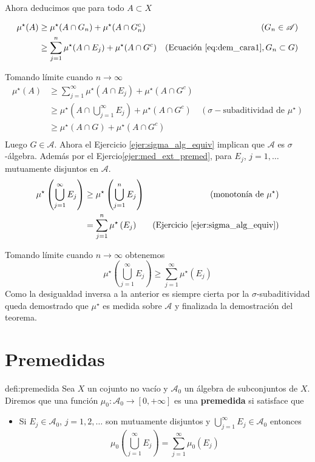 \begin{demo}
Ahora deducimos que para todo $A\subset X$


\begin{align*}
\mu^\star( A)&\geq  \mu^\star(A\cap G_n)+ \mu^\star(A\cap G_n^c) & (G_n\in\mathscr{A})\\
& \geq \sum_{j=1}^n\mu^\star(A\cap E_j)+\mu^\star(A\cap G^c) & (\text{Ecuación \eqref{eq:dem_cara1}}, G_n\subset G)\\ 
\end{align*}

Tomando límite cuando $n\to\infty$
\begin{align*}
\mu^\star( A)&\geq  \sum_{j=1}^{\infty}\mu^\star(A\cap E_j)+\mu^\star(A\cap G^c) &  \\ 
             &\geq  \mu^\star\left(A\cap \bigcup_{j=1}^{\infty} E_j\right)+\mu^\star(A\cap G^c) & (\sigma-\text{subaditividad de } \mu^\star)  \\ 
             &\geq  \mu^\star\left(A\cap G \right)+\mu^\star(A\cap G^c) &   \\ 
\end{align*}
Luego $G\in\mathscr{A}$. Ahora el Ejercicio \ref{ejer:sigma_alg_equiv} implican que $\mathscr{A}$ es $\sigma$-álgebra. Además por el Ejercio\ref {ejer:med_ext_premed}, para $E_j$, $j=1,\ldots$ mutuamente disjuntos en $\mathscr{A}$.
\begin{align*}
 \mu^\star\left(\bigcup_{j=1}^{\infty} E_j\right) &\geq \mu^\star\left(\bigcup_{j=1}^{n} E_j\right) & (\text{monotonía de } \mu^\star)\\ 
 &= \sum_{j=1}^{n}  \mu^\star\left(E_j\right) & (\text{Ejercicio \ref{ejer:sigma_alg_equiv}}) \\ 
\end{align*}

Tomando límite cuando $n\to\infty$ obtenemos 
\[\mu^\star\left(\bigcup_{j=1}^{\infty} E_j\right) \geq \sum_{j=1}^{\infty}  \mu^\star\left(E_j\right)\]
Como la desigualdad inversa a la anterior es siempre cierta por la $\sigma$-subaditividad queda demostrado que $\mu^\star$ es medida sobre $\mathscr{A}$ y finalizada la demostración del teorema.   
 \end{demo}

\section{Premedidas}

\begin{definicion}[Premedida]{defi:premedida}
 Sea $X$ un cojunto no vacío y $\mathscr{A}_0$ un álgebra de subconjuntos de $X$. Diremos que una función $\mu_0: \mathscr{A}_0\to [0,+\infty]$ es una \textbf{premedida} si satisface que
 \begin{itemize}
  \item  Si $E_j\in\mathscr{A}_0$, $j=1,2,\ldots$ son mutuamente disjuntos y $\bigcup\limits_{j=1}^{\infty}E_j\in\mathscr{A}_0$ entonces
  \[\mu_0\left(\bigcup\limits_{j=1}^{\infty} E_j\right) = \sum\limits_{j=1}^{\infty}  \mu_0\left(E_j\right)\]
\end{itemize}

  
 
\end{definicion}



